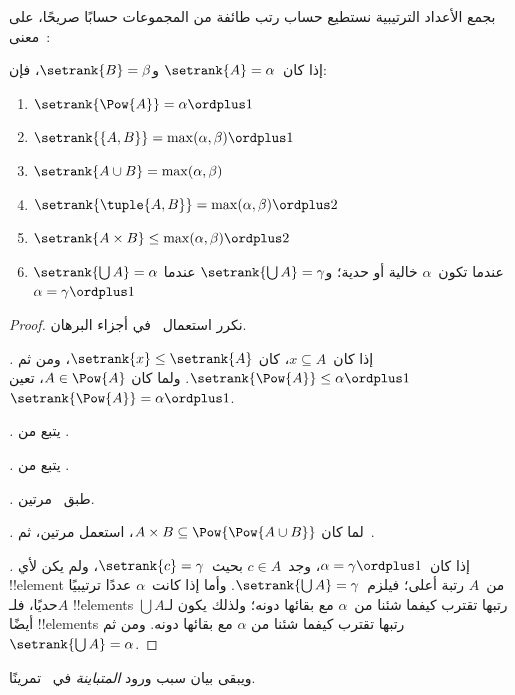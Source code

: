 \documentclass[../../../include/open-logic-section]{subfiles}
\begin{document}

بجمع الأعداد الترتيبية نستطيع حساب رتب طائفة من المجموعات حسابًا
صريحًا، على معنى~:

\begin{lem}
إذا كان~$\setrank{A} = \alpha$ و$\setrank{B} = \beta$، فإن:
\begin{enumerate}
	\item{} $\setrank{\Pow{A}} = \alpha\ordplus 1$
	\item{} $\setrank{\{A, B\}} = \max(\alpha,
	\beta) \ordplus 1$
	\item{} $\setrank{A \cup B} = \max(\alpha,
	\beta)$
	\item{} $\setrank{\tuple{A,B}} = \max(\alpha,
	\beta) \ordplus 2$
	\item{} $\setrank{A \times B} \leq \max(\alpha,
	\beta) \ordplus 2$
	\item{} $\setrank{\bigcup A} = \alpha$ عندما
	تكون~$\alpha$ خالية أو حدية؛ و$\setrank{\bigcup A} = \gamma$ عندما
	$\alpha = \gamma\ordplus 1$
\end{enumerate}
\end{lem}

\begin{proof}
نكرر استعمال~ في أجزاء البرهان.

\emph{.} إذا كان~$x \subseteq A$، كان
$\setrank{x} \leq \setrank{A}$، ومن ثم
$\setrank{\Pow{A}} \leq \alpha \ordplus 1$. ولما كان
$A \in \Pow{A}$، تعين~$\setrank{\Pow{A}} = \alpha \ordplus 1$.

\emph{.} يتبع من
.

\emph{.} يتبع من
.

\emph{.} طبق~ مرتين.

\emph{.} لما كان
$A \times B \subseteq \Pow{\Pow{A \cup B}}$، استعمل
 مرتين، ثم~.

\emph{.} إذا كان~$\alpha = \gamma\ordplus 1$،
وجد~$c \in A$ بحيث~$\setrank{c} = \gamma$، ولم يكن لأي
!!{element} من~$A$ رتبة أعلى؛ فيلزم~$\setrank{\bigcup A} = \gamma$.
وأما إذا كانت~$\alpha$ عددًا ترتيبيًا حديًا، فلـ$A$ !!{element}s
رتبها تقترب كيفما شئنا من~$\alpha$ مع بقائها دونه؛ ولذلك يكون
لـ$\bigcup A$ أيضًا !!{element}s رتبها تقترب كيفما شئنا من
$\alpha$ مع بقائها دونه. ومن ثم~$\setrank{\bigcup A} = \alpha$.
\end{proof}
\noindent
ويبقى بيان سبب ورود \emph{المتباينة} في~ تمرينًا.
\end{document}
